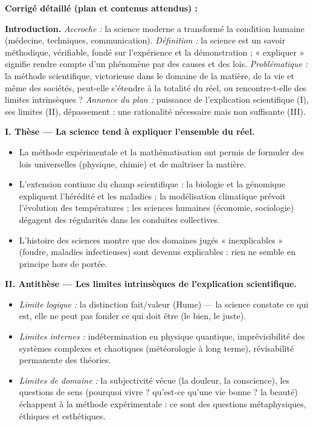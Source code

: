 \documentclass[11pt]{article}
\newcommand{\cle}[1]{{\popxbold\color{popdark}#1}}
\begin{document}
\begin{corrige}
\textbf{Corrigé détaillé (plan et contenus attendus) :}

\textbf{Introduction.} \emph{Accroche :} la science moderne a transformé la condition humaine (médecine, techniques, communication). \emph{Définition :} la science est un savoir méthodique, vérifiable, fondé sur l'expérience et la démonstration ; « expliquer » signifie rendre compte d'un phénomène par des causes et des lois. \emph{Problématique :} la méthode scientifique, victorieuse dans le domaine de la matière, de la vie et même des sociétés, peut-elle s'étendre à la totalité du réel, ou rencontre-t-elle des limites intrinsèques ? \emph{Annonce du plan :} puissance de l'explication scientifique (I), ses limites (II), dépassement : une rationalité nécessaire mais non suffisante (III).

\textbf{I. Thèse — La science tend à expliquer l'ensemble du réel.}
\begin{itemize}
    \item La \cle{méthode expérimentale} et la mathématisation ont permis de formuler des lois universelles (physique, chimie) et de maîtriser la matière.
    \item L'extension continue du champ scientifique : la biologie et la \cle{génomique} expliquent l'hérédité et les maladies ; la modélisation climatique prévoit l'évolution des températures ; les sciences humaines (économie, sociologie) dégagent des régularités dans les conduites collectives.
    \item L'histoire des sciences montre que des domaines jugés « inexplicables » (foudre, maladies infectieuses) sont devenus explicables : rien ne semble en principe hors de portée.
\end{itemize}

\textbf{II. Antithèse — Les limites intrinsèques de l'explication scientifique.}
\begin{itemize}
    \item \emph{Limite logique :} la distinction \cle{fait/valeur} (Hume) — la science constate ce qui est, elle ne peut pas fonder ce qui doit être (le bien, le juste).
    \item \emph{Limites internes :} indétermination en physique quantique, imprévisibilité des systèmes complexes et chaotiques (météorologie à long terme), révisabilité permanente des théories.
    \item \emph{Limites de domaine :} la subjectivité vécue (la douleur, la conscience), les questions de \cle{sens} (pourquoi vivre ? qu'est-ce qu'une vie bonne ? la beauté) échappent à la méthode expérimentale : ce sont des questions métaphysiques, éthiques et esthétiques.
\end{itemize}


\end{corrige}
\end{document}

